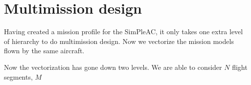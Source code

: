 \section{Multimission design}
\label{s:multimission}

Having created a mission profile for the SimPleAC, it only takes one extra level of
hierarchy to do multimission design. Now we vectorize the mission models flown by the same aircraft.

%
%

Now the vectorization has gone down two levels. We are able to consider $N$ flight segments, $M$


